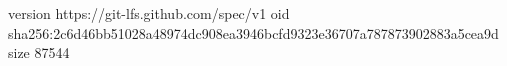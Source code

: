 version https://git-lfs.github.com/spec/v1
oid sha256:2c6d46bb51028a48974dc908ea3946bcfd9323e36707a787873902883a5cea9d
size 87544
